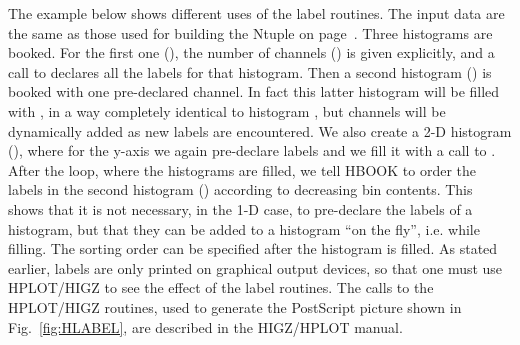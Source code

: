 The example below shows different uses of the label routines.
The input data are the same as those used for building the Ntuple
on page~\pageref{sec:ntuplestaff}.
Three histograms are booked. For the first one (), the number
of channels () is given explicitly, and a call to 
declares all the labels for that histogram.
Then a second histogram () is booked with one pre-declared channel.
In fact this latter histogram will be filled with , in a way
completely identical to histogram , 
but channels will be dynamically added as new labels are encountered.
We also create a 2-D histogram (), where for the y-axis we
again pre-declare labels and we fill it with a call to .
After the loop, where the histograms are filled, we tell HBOOK to
order the labels in the second histogram () according to
decreasing bin contents.
This shows that it is not necessary, in the 1-D case, to
pre-declare the labels of a histogram, but that they can be
added to a histogram ``on the fly'', i.e. while filling.
The sorting order can be specified after the histogram is filled.
As stated earlier, labels are only printed on graphical output devices,
so that one must use HPLOT/HIGZ to see the effect of the label routines.
The calls to the HPLOT/HIGZ routines, used to generate the PostScript
picture shown in Fig.~\ref{fig:HLABEL}, are described in the HIGZ/HPLOT
manual.

\newpage

